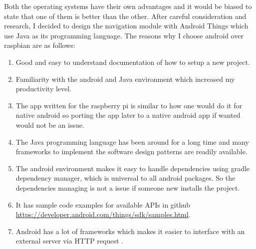         \newpage 
        \par
            Both the operating systems have their own advantages and it would be biased to state that
            one of them is better than the other. After careful consideration and research, I
            decided to design the navigation module with Android Things which use Java as its
            programming language. The reasons why I choose android over raspbian are as follows:
            \begin{enumerate}
                \item 
                    Good and easy to understand documentation of how to setup 
                    a new project.
                \item 
                    Familiarity with the android and Java environment which increased my
                    productivity level.  
                \item 
                    The app written for the raspberry pi is similar to how one would
                    do it for native android so porting the app later to a native android
                    app if wanted would not be an issue. 
                \item 
                    The Java programming language has been around for a long time and many
                    frameworks to implement the software design patterns are readily 
                    available.
                \item 
                    The android environment makes it easy to handle dependencies using gradle
                    dependency manager, which is universal to all android packages. So the 
                    dependencies managing is not a issue if someone new installs the project.  
                \item
                    It has sample code examples for available APIs in github 
                    \url{https://developer.android.com/things/sdk/samples.html}. 
                \item
                    Android has a lot of frameworks which makes it easier to interface with an
                    external server via HTTP request \cite{http}.
            \end{enumerate}